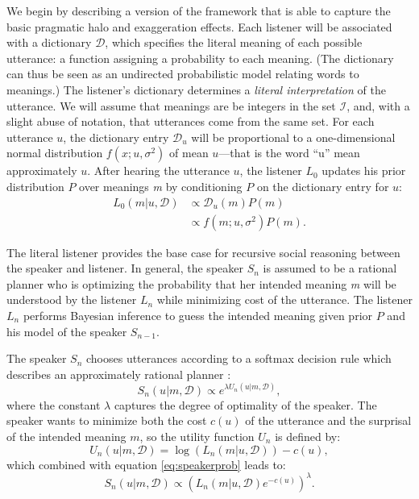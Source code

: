 \documentclass{article} %
\newcommand{\dictionary}{\ensuremath{\mathcal{D}}\xspace}
\begin{document}
We begin by describing a version of the framework that is able to capture the basic pragmatic halo and exaggeration effects.
Each listener will be associated with a dictionary $\dictionary$, which specifies the literal meaning of each possible utterance: a function assigning a probability to each meaning. (The dictionary can thus be seen as an undirected probabilistic model relating words to meanings.) The listener's dictionary determines a \emph{literal interpretation} of the utterance. We will assume that meanings are be integers in the set $\mathcal{I}$, and, with a slight abuse of notation, that utterances come from the same set. For each utterance $u$, the dictionary entry $\dictionary_u$ will be proportional to a one-dimensional normal distribution $f(x;u,\sigma^2)$ of mean $u$---that is the word ``u'' mean approximately $u$. After hearing the utterance $u$, the listener $L_0$ updates his prior distribution $P$ over meanings \emph{m} by conditioning $P$ on the dictionary entry for $u$:
\begin{align}\label{eq:literallistener}
L_0(m | u, \dictionary) &\propto \dictionary_u(m)P(m) \\
&\propto f(m;u,\sigma^2)P(m).
\end{align}

The literal listener provides the base case for recursive social reasoning between the speaker and listener. In general, the speaker $S_n$ is assumed to be a rational planner who is optimizing the probability that her intended meaning \emph{m} will be understood by the listener $L_n$ while minimizing cost of the utterance. The listener $L_n$ performs Bayesian inference to guess the intended meaning given prior $P$ and his model of the speaker $S_{n-1}$.

The speaker $S_n$ chooses utterances according to a softmax decision rule which describes an approximately rational planner \cite{sutton1998reinforcement}:
\begin{equation}\label{eq:speakerprob}
S_n(u | m,\dictionary) \propto e^{\lambda U_n(u | m,\dictionary)},
\end{equation}
where the constant $\lambda$ captures the degree of optimality of the speaker. 
The speaker wants to minimize both the cost $c(u)$ of the utterance and the surprisal of the intended meaning $m$, so the utility function $U_n$ is defined by:
\begin{equation}\label{eq:speakerutility}
U_n(u | m, \dictionary) = \log (L_{n}(m | u, \dictionary)) - c(u),
\end{equation}
which combined with equation \ref{eq:speakerprob} leads to:
\begin{equation}\label{eq:speakersimplified}
S_n(u | m, \dictionary) \propto (L_{n}(m | u,\dictionary)e^{-c(u)}) ^\lambda.
\end{equation}
\end{document}
